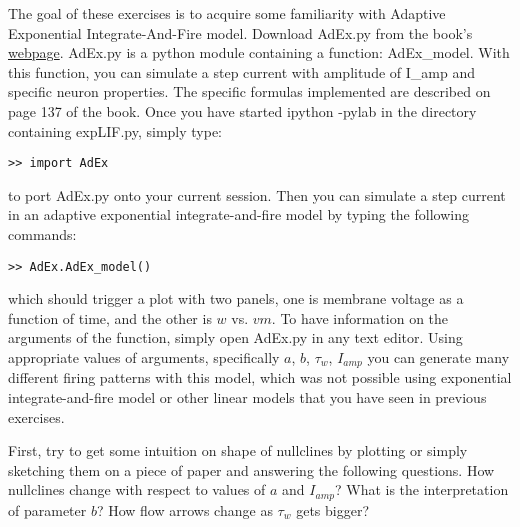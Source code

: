 \documentclass[a4paper,10pt]{Exercises}
\begin{document}
\newcommand{\erf}{\textrm{erf}}



The goal of these exercises is to acquire some familiarity with Adaptive Exponential  Integrate-And-Fire model.
Download AdEx.py from the book's \href{http://neuronaldynamics.epfl.ch/lectures.html}{webpage}.  AdEx.py is a python module containing a function:  AdEx\_model. With this function, you can simulate a step current with amplitude of I\_amp and specific neuron properties.  The specific formulas implemented are described on page 137 of the book.  Once you have started ipython -pylab in the directory containing expLIF.py, simply type:
\begin{verbatim}
>> import AdEx
\end{verbatim}
to port AdEx.py onto your current session. Then you can simulate a step current in an adaptive exponential integrate-and-fire model by typing the following commands:  
\begin{verbatim}
>> AdEx.AdEx_model()
\end{verbatim}
which should trigger a plot with two panels, one is membrane voltage as a function of time, and the other is $w$ vs. $vm$.  To have information on the arguments of the function, simply open AdEx.py in any text editor. Using appropriate values of arguments, specifically $a$, $b$, $\tau_w$, $I_{amp}$ you can generate many different firing patterns with this model, which was not possible using exponential integrate-and-fire model or other linear models that you have seen in previous exercises.


\Exercise[]

First, try to get some intuition on shape of nullclines by plotting  or simply sketching them on a piece of paper and answering the following questions.
\Question How nullclines change with respect to values of $a$ and $I_{amp}$?
\Question What is the interpretation of parameter $b$?
\Question How flow arrows change as $\tau_w$ gets bigger?
\end{document}
